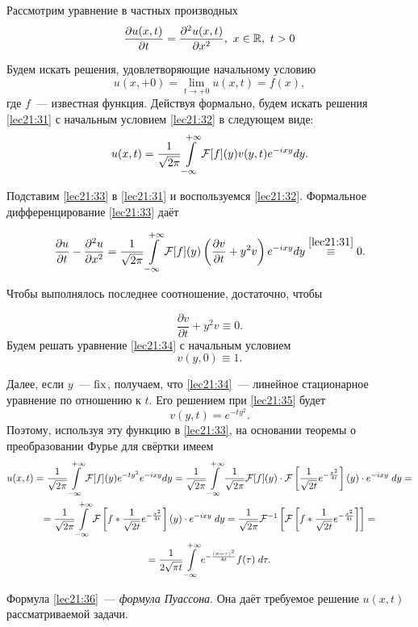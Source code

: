 \documentclass[../../main.tex]{subfiles}
\begin{document}
\begin{example}
Рассмотрим уравнение в частных производных
\begin{equation}
\label{lec21:31}
\frac{\partial u(x,t)}{\partial t} = \frac{\partial^2 u(x,t)}{\partial x^2}, 
\ x\in \mathbb{R}, \ t > 0
\end{equation}

Будем искать решения, удовлетворяющие начальному условию
\begin{equation}
  \label{lec21:32}
  u(x,+0) = \lim_{t\to+0} u(x,t) = f(x),
\end{equation}
где $f$~--- известная функция.
Действуя формально, будем искать решения \eqref{lec21:31}  с начальным 
условием \eqref{lec21:32} в следующем виде:
\begin{equation}
  \label{lec21:33}
  u(x, t) = \frac{1}{\sqrt{2\pi}} \int\limits_{-\infty}^{+\infty} \mathcal{F}[f](y)v(y,t)e^{-ixy}dy.
\end{equation}

Подставим \eqref{lec21:33} в \eqref{lec21:31} и воспользуемся 
\eqref{lec21:32}. 
Формальное дифференцирование \eqref{lec21:33} даёт

\[\frac{\partial u}{\partial t} - \frac{\partial^2 u}{\partial x^2} = 
\frac{1}{\sqrt{2\pi}} \int\limits_{-\infty}^{+\infty} \mathcal{F}[f](y)\left(\frac{\partial v}{\partial t} + 
y^2v\right)e^{-ixy}dy \stackrel{\eqref{lec21:31}}{\equiv} 0.\]

Чтобы выполнялось последнее соотношение, достаточно, чтобы

\begin{equation}
\label{lec21:34}
\frac{\partial v}{\partial t} + y^2v \equiv 0.
\end{equation}
Будем решать уравнение \eqref{lec21:34} с начальным условием
\begin{equation}
\label{lec21:35}
v(y,0) \equiv 1.
\end{equation}

Далее, если $y$~--- $\operatorname{fix}$, получаем, что \eqref{lec21:34}~--- линейное 
стационарное уравнение по отношению к $t$. Его решением при \eqref{lec21:35} 
будет
\[v(y,t) = e^{-ty^2}.\]
Поэтому, используя эту функцию в \eqref{lec21:33}, на основании теоремы 
о преобразовании Фурье для свёртки имеем
\begin{multline}
  \label{lec21:36}
  u(x,t) = \frac{1}{\sqrt{2\pi}} \int\limits_{-\infty}^{+\infty} \mathcal{F}[f](y)e^{-ty^2}e^{-ixy}dy =
  \frac{1}{\sqrt{2\pi}} \int\limits_{-\infty}^{+\infty} \frac1{\sqrt{2\pi}}\mathcal{F}[f](y)\cdot 
  \mathcal{F}\left[\frac{1}{\sqrt{2t}}e^{-\frac{x^2}{4t}}\right](y) \cdot e^{-ixy}
  \;dy =\\=
  \frac{1}{\sqrt{2\pi}} \int\limits_{-\infty}^{+\infty} \mathcal{F}\left[f * 
  \frac{1}{\sqrt{2t}}e^{-\frac{x^2}{4t}}
  \right](y)\cdot e^{-ixy}\;dy = \frac{1}{\sqrt{2\pi}} 
  \mathcal{F}^{-1}\left[\mathcal{F}\left[f*\frac{1}{\sqrt{2t}}e^{-
  \frac{x^2}{4t}}\right]\right] =\\=
  \frac{1}{2\sqrt{\pi t}} \int\limits_{-\infty}^{+\infty} e^{-\frac{(x-\tau)^2}{4t}}f(\tau)\;d\tau.
\end{multline}

Формула \eqref{lec21:36}~--- \emph{формула Пуассона}. Она даёт требуемое 
решение $u(x,t)$ рассматриваемой задачи.
\end{example}
\end{document}

